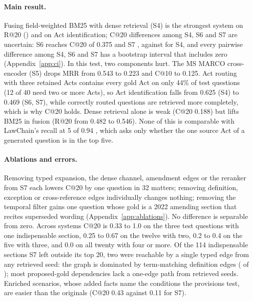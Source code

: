 \documentclass{article}
\begin{document}
\begin{table}[t]
  \caption{Test split (\nTestQ{} questions, \nTestM{} matters), matter-macro means. R = indispensable recall, C = complete-indispensable recall, Act = Act identification accuracy. Bootstrap intervals in Appendix~\ref{app:ci}.}
  \label{tab:main}
  \centering
  \small
  
\end{table}

\paragraph{Main result.} Fusing field-weighted BM25 with dense retrieval (S4)
is the strongest system on R@20 (\rAtTwentyRef{}) and on Act identification;
C@20 differences among S4, S6 and S7 are uncertain: S6 reaches C@20 of
0.375 and S7 \cAtTwentyOurs{}, against \cAtTwentyRef{} for S4, and every
pairwise difference among S4, S6 and S7 has a bootstrap interval that includes
zero (Appendix~\ref{app:ci}). In this test, two components hurt. The MS MARCO
cross-encoder (S5) drops MRR from 0.543 to 0.223 and C@10 to 0.125. Act
routing with three retained Acts contains every gold Act on only 44\% of test
questions (12 of 40 need two or more Acts), so Act identification falls from
0.625 (S4) to 0.469 (S6, S7), while correctly routed questions are retrieved
more completely, which is why C@20 holds. Dense retrieval alone is weak (C@20
0.188) but lifts BM25 in fusion (R@20 from 0.482 to 0.546). None of this is
comparable with LawChain's recall at 5 of 0.94 \citep{atukorala2026lawchain},
which asks only whether the one source Act of a generated question is in the
top five.

\paragraph{Ablations and errors.} Removing typed expansion, the dense channel,
amendment edges or the reranker from S7 each lowers C@20 by one question in
32 matters; removing definition, exception or cross-reference edges
individually changes nothing; removing the temporal filter gains one question
whose gold is a 2022 amending section that recites superseded wording
(Appendix~\ref{app:ablations}). No difference is separable from zero. Across
systems C@20 is 0.33 to 1.0 on the three test questions with one indispensable
section, 0.25 to 0.67 on the twelve with two, 0.2 to 0.4 on the five with
three, and 0.0 on all twenty with four or more. Of the 114 indispensable
sections S7 left outside its top 20, two were reachable by a single typed edge
from any retrieved seed: the graph is dominated by term-matching definition
edges (\nEdgesDefines{} of \nEdges{}); most proposed-gold dependencies lack a
one-edge path from retrieved seeds. Enriched
scenarios, whose added facts name the conditions the provisions test, are
easier than the originals (C@20 0.43 against 0.11 for S7).
\end{document}
